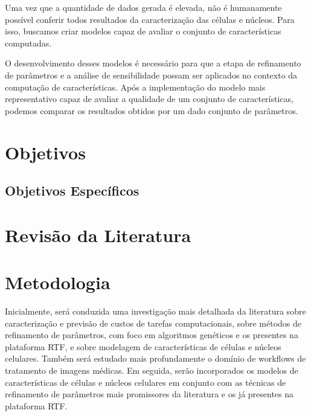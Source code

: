 \documentclass[a4paper,10pt]{article}
\begin{document}
Uma vez que a quantidade de dados gerada é elevada, não é humanamente possível conferir todos resultados da caracterização das células e núcleos. Para isso, buscamos criar modelos capaz de avaliar o conjunto de características computadas.

O desenvolvimento desses modelos é necessário para que a etapa de refinamento de parâmetros e a análise de sensibilidade possam ser aplicados no contexto da computação de características. Após a implementação do modelo mais representativo capaz de avaliar a qualidade de um conjunto de características, podemos comparar os resultados obtidos por um dado conjunto de parâmetros. 


\section{Objetivos}

\subsection{Objetivos Específicos}


\section{Revisão da Literatura}

\section{Metodologia}
Inicialmente, será conduzida uma investigação mais detalhada da literatura sobre caracterização e previsão de custos de tarefas computacionais, sobre métodos de refinamento de parâmetros, com foco em algoritmos genéticos e os presentes na plataforma RTF, e sobre modelagem de características de células e núcleos celulares. Também será estudado mais profundamente o domínio de workflows de tratamento de imagens médicas. Em seguida, serão incorporados os modelos de características de células e núcleos celulares em conjunto com as técnicas de refinamento de parâmetros mais promissores da literatura e os já presentes na plataforma RTF.
\end{document}
